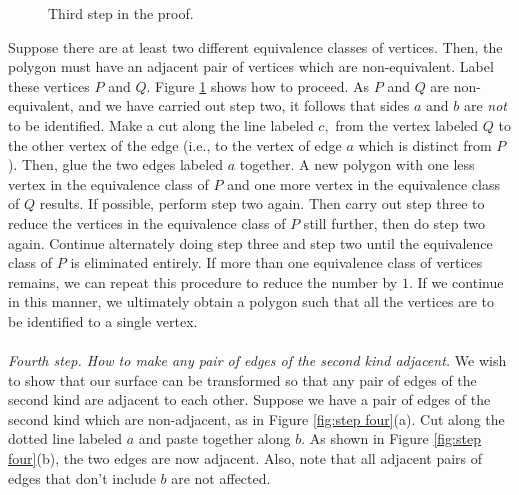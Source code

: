 \documentclass{article}
\theoremstyle{definition}
\begin{document}
\begin{figure}[!htb]
  \centering
  
  \caption{Third step in the proof.}
  \label{fig:step three}
\end{figure}
Suppose there are at least two different equivalence classes of vertices. Then, the polygon must have an adjacent pair of vertices which are non-equivalent. Label these vertices $P$ and $Q.$ Figure \ref{fig:step three} shows how to proceed. As $P$ and $Q$ are non-equivalent, and we have carried out step two, it follows that sides $a$ and $b$ are \emph{not} to be identified. Make a cut along the line labeled $c,$ from the vertex labeled $Q$ to the other vertex of the edge (i.e., to the vertex of edge $a$ which is distinct from $P$). Then, glue the two edges labeled $a$ together. A new polygon with one less vertex in the equivalence class of $P$ and one more vertex in the equivalence class of $Q$ results. If possible, perform step two again. Then carry out step three to reduce the vertices in the equivalence class of $P$ still further, then do step two again. Continue alternately doing step three and step two until the equivalence class of $P$ is eliminated entirely. If more than one equivalence class of vertices remains, we can repeat this procedure to reduce the number by $1.$ If we continue in this manner, we ultimately obtain a polygon such that all the vertices are to be identified to a single vertex.\\~\\
%
\emph{Fourth step. How to make any pair of edges of the second kind adjacent.} We wish to show that our surface can be transformed so that any pair of edges of the second kind are adjacent to each other. Suppose we have a pair of edges of the second kind which are non-adjacent, as in Figure \ref{fig:step four}(a). Cut along the dotted line labeled $a$ and paste together along $b.$ As shown in Figure \ref{fig:step four}(b), the two edges are now adjacent. Also, note that all adjacent pairs of edges that don't include $b$ are not affected. 
\end{document}
